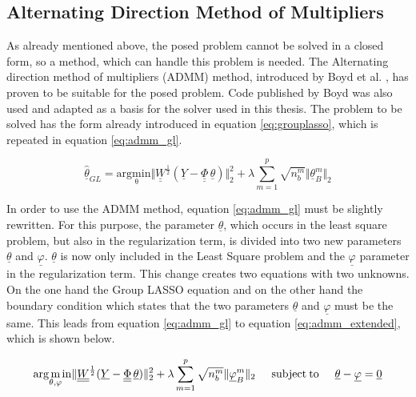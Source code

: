 \subsection{Alternating Direction Method of Multipliers}
\label{sec:ADMM}

As already mentioned above, the posed problem cannot be solved in a closed form, so a method, which can handle this problem is needed. The Alternating direction method of multipliers (ADMM) method, introduced by Boyd et al. \cite{Boyd_2010}, has proven to be suitable for the posed problem. Code published by Boyd was also used and adapted as a basis for the solver used in this thesis. The problem to be solved has the form already introduced in equation \ref{eq:grouplasso}, which is repeated in equation \ref{eq:admm_gl}.


 \begin{equation}
	\hat{\underline{\theta}}_{GL} = \mathrm{arg \underset{\theta} min} \Vert \underline{\underline{W}}^{\frac{1}{2}} (\underline{Y}-\underline{\underline{\Phi}} \, \underline{\theta}) \Vert^2_2 + \lambda \sum_{m=1}^p \sqrt{n^m_b} \Vert \underline{\theta}^m_B \Vert_2
	\label{eq:admm_gl}
\end{equation}

In order to use the ADMM method, equation \ref{eq:admm_gl} must be slightly rewritten. For this purpose, the parameter $\underline{\theta}$, which occurs in the least square problem, but also in the regularization term, is divided into two new parameters $\underline{\theta}$ and $\underline{\varphi}$. $\underline{\theta}$ is now only included in the Least Square problem and the $\underline{\varphi}$ parameter in the regularization term. This change creates two equations with two unknowns. On the one hand the Group LASSO equation and on the other hand the boundary condition which states that the two parameters $\underline{\theta}$ and $\underline{\varphi}$ must be the same. This leads from equation \ref{eq:admm_gl} to equation \ref{eq:admm_extended}, which is shown below.

 \begin{equation}
	\mathrm{arg \underset{\theta, \varphi} min} \Vert \underline{\underline{W}}^{\frac{1}{2}} (\underline{Y}-\underline{\underline{\Phi}} \, \underline{\theta}) \Vert^2_2 + \lambda \sum_{m=1}^p \sqrt{n^m_b} \Vert \underline{\varphi}^m_B \Vert_2 \hspace{0.5cm} \mathrm{subject \: to} \hspace{0.5cm} \underline{\theta} - \underline{\varphi} = \underline{0}
	\label{eq:admm_extended}
\end{equation}

